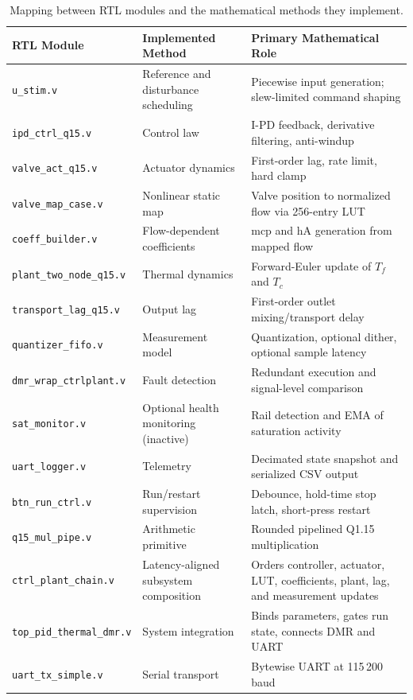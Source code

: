 \begin{table}[h!]
  \centering
  \caption{Mapping between RTL modules and the mathematical methods
           they implement.}
  \label{tab:bench_modules}
  \renewcommand{\arraystretch}{1.3}
  \begin{tabular}{@{} p{4.2cm} p{3.5cm} p{6.0cm} @{}}
    \toprule
    \textbf{RTL Module} & \textbf{Implemented Method} &
    \textbf{Primary Mathematical Role} \\
    \midrule
    \texttt{u\_stim.v}
      & Reference and disturbance scheduling
      & Piecewise input generation; slew-limited command shaping \\
    \texttt{ipd\_ctrl\_q15.v}
      & Control law
      & I-PD feedback, derivative filtering, anti-windup \\
    \texttt{valve\_act\_q15.v}
      & Actuator dynamics
      & First-order lag, rate limit, hard clamp \\
    \texttt{valve\_map\_case.v}
      & Nonlinear static map
      & Valve position to normalized flow via 256-entry LUT \\
    \texttt{coeff\_builder.v}
      & Flow-dependent coefficients
      & $\mathrm{mcp}$ and $\mathrm{hA}$ generation from mapped flow \\
    \texttt{plant\_two\_node\_q15.v}
      & Thermal dynamics
      & Forward-Euler update of $T_f$ and $T_c$ \\
    \texttt{transport\_lag\_q15.v}
      & Output lag
      & First-order outlet mixing/transport delay \\
    \texttt{quantizer\_fifo.v}
      & Measurement model
      & Quantization, optional dither, optional sample latency \\
    \texttt{dmr\_wrap\_ctrlplant.v}
      & Fault detection
      & Redundant execution and signal-level comparison \\
    \texttt{sat\_monitor.v}
      & Optional health monitoring (inactive)
      & Rail detection and EMA of saturation activity \\
    \texttt{uart\_logger.v}
      & Telemetry
      & Decimated state snapshot and serialized CSV output \\
    \texttt{btn\_run\_ctrl.v}
      & Run/restart supervision
      & Debounce, hold-time stop latch, short-press restart \\
    \texttt{q15\_mul\_pipe.v}
      & Arithmetic primitive
      & Rounded pipelined Q1.15 multiplication \\
    \texttt{ctrl\_plant\_chain.v}
      & Latency-aligned subsystem composition
      & Orders controller, actuator, LUT, coefficients, plant,
        lag, and measurement updates \\
    \texttt{top\_pid\_thermal\_dmr.v}
      & System integration
      & Binds parameters, gates run state, connects DMR and UART \\
    \texttt{uart\_tx\_simple.v}
      & Serial transport
      & Bytewise UART at 115\,200\,baud \\
    \bottomrule
  \end{tabular}
\end{table}

